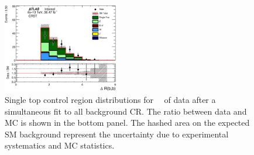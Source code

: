 \begin{figure}[htbp]
\begin{center}
\includegraphics[width=0.45\textwidth]{figures/singleTop/postfit/DRBB_CRST.eps}
\end{center}
\caption{Single top control region distributions for \intlumi\ \ifb\ of data after a simultaneous fit to all background CR. The ratio between data and MC is shown in the bottom panel. The hashed area on the expected SM background represent the uncertainty due to experimental systematics and MC statistics.}
\label{fig:CRST}
\end{figure}

